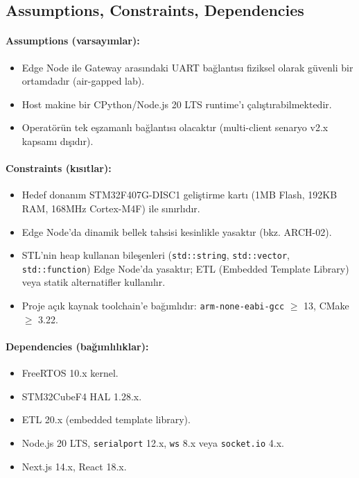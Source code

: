 \subsection{Assumptions, Constraints, Dependencies}
\paragraph{Assumptions (varsayımlar):}
\begin{itemize}
    \item Edge Node ile Gateway arasındaki UART bağlantısı fiziksel olarak güvenli bir ortamdadır (air-gapped lab).
    \item Host makine bir CPython/Node.js 20 LTS runtime'ı çalıştırabilmektedir.
    \item Operatörün tek eşzamanlı bağlantısı olacaktır (multi-client senaryo v2.x kapsamı dışıdır).
\end{itemize}

\paragraph{Constraints (kısıtlar):}
\begin{itemize}
    \item Hedef donanım STM32F407G-DISC1 geliştirme kartı (1MB Flash, 192KB RAM, 168MHz Cortex-M4F) ile sınırlıdır.
    \item Edge Node'da dinamik bellek tahsisi kesinlikle yasaktır (bkz. ARCH-02).
    \item STL'nin heap kullanan bileşenleri (\texttt{std::string}, \texttt{std::vector}, \texttt{std::function}) Edge Node'da yasaktır; ETL (Embedded Template Library) veya statik alternatifler kullanılır.
    \item Proje açık kaynak toolchain'e bağımlıdır: \texttt{arm-none-eabi-gcc} $\geq$ 13, CMake $\geq$ 3.22.
\end{itemize}

\paragraph{Dependencies (bağımlılıklar):}
\begin{itemize}
    \item FreeRTOS 10.x kernel.
    \item STM32CubeF4 HAL 1.28.x.
    \item ETL 20.x (embedded template library).
    \item Node.js 20 LTS, \texttt{serialport} 12.x, \texttt{ws} 8.x veya \texttt{socket.io} 4.x.
    \item Next.js 14.x, React 18.x.
\end{itemize}
